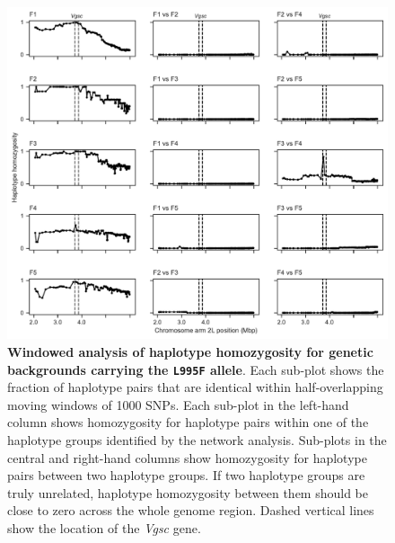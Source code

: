 \documentclass[a4paper,11pt,abstracton,hidelinks]{scrartcl}
\begin{document}
%
\begin{figure}[!b]
  \includegraphics[width=1.1\linewidth,center]{artwork/mhh_F.pdf}
  \caption{\textbf{Windowed analysis of haplotype homozygosity for genetic backgrounds carrying the \texttt{L995F} allele}. Each sub-plot shows the fraction of haplotype pairs that are identical within half-overlapping moving windows of 1000 SNPs. Each sub-plot in the left-hand column shows homozygosity for haplotype pairs within one of the haplotype groups identified by the network analysis. Sub-plots in the central and right-hand columns show homozygosity for haplotype pairs between two haplotype groups. If two haplotype groups are truly unrelated, haplotype homozygosity between them should be close to zero across the whole genome region. Dashed vertical lines show the location of the \textit{Vgsc} gene.}
  \label{fig:mhh_f}
\end{figure}

\clearpage
\end{document}
